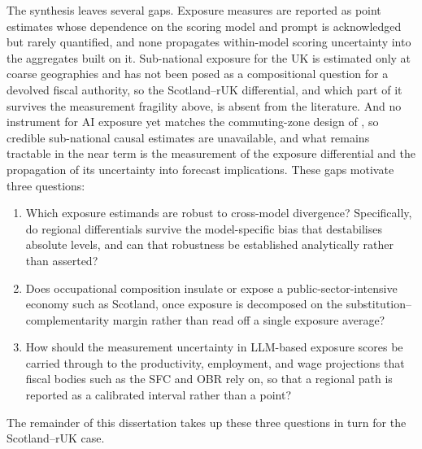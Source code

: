 The synthesis leaves several gaps. Exposure measures are reported as point estimates whose dependence on the scoring model and prompt is acknowledged but rarely quantified, and none propagates within-model scoring uncertainty into the aggregates built on it. Sub-national exposure for the UK is estimated only at coarse geographies and has not been posed as a compositional question for a devolved fiscal authority, so the Scotland--rUK differential, and which part of it survives the measurement fragility above, is absent from the literature. And no instrument for AI exposure yet matches the commuting-zone design of \citet{acemoglu2020}, so credible sub-national causal estimates are unavailable, and what remains tractable in the near term is the measurement of the exposure differential and the propagation of its uncertainty into forecast implications. These gaps motivate three questions:

\begin{enumerate}
\item Which exposure estimands are robust to cross-model divergence? Specifically, do regional differentials survive the model-specific bias that destabilises absolute levels, and can that robustness be established analytically rather than asserted?
\item Does occupational composition insulate or expose a public-sector-intensive economy such as Scotland, once exposure is decomposed on the substitution--complementarity margin rather than read off a single exposure average?
\item How should the measurement uncertainty in LLM-based exposure scores be carried through to the productivity, employment, and wage projections that fiscal bodies such as the SFC and OBR rely on, so that a regional path is reported as a calibrated interval rather than a point?
\end{enumerate}

The remainder of this dissertation takes up these three questions in turn for the Scotland--rUK case.